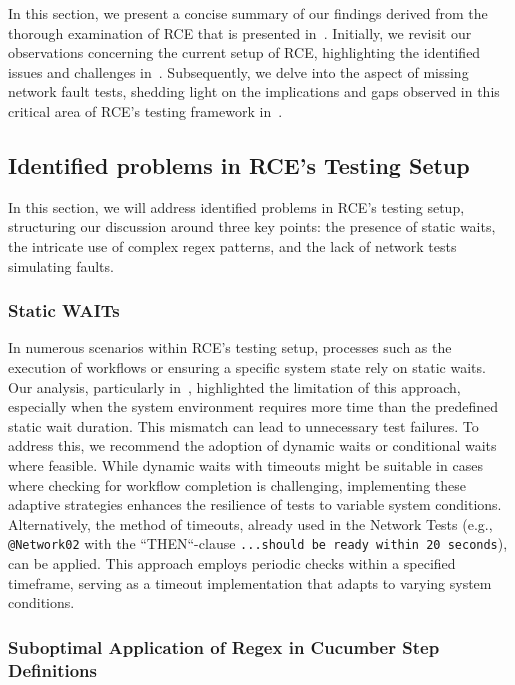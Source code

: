 In this section, we present a concise summary of our findings derived from the thorough examination of \ac{RCE} that is presented in~. Initially, we revisit our observations concerning the current setup of RCE, highlighting the identified issues and challenges in~. Subsequently, we delve into the aspect of missing network fault tests, shedding light on the implications and gaps observed in this critical area of RCE's testing framework in~. 

\subsection{Identified problems in RCE's Testing Setup}
\label{sub:identified-problems}
In this section, we will address identified problems in RCE's testing setup, structuring our discussion around three key points: the presence of static waits, the intricate use of complex regex patterns, and the lack of network tests simulating faults.

\subsubsection{Static WAITs}
In numerous scenarios within \ac{RCE}'s testing setup, processes such as the execution of workflows or ensuring a specific system state rely on static waits. Our analysis, particularly in~, highlighted the limitation of this approach, especially when the system environment requires more time than the predefined static wait duration. This mismatch can lead to unnecessary test failures. To address this, we recommend the adoption of dynamic waits or conditional waits where feasible. While dynamic waits with timeouts might be suitable in cases where checking for workflow completion is challenging, implementing these adaptive strategies enhances the resilience of tests to variable system conditions. Alternatively, the method of timeouts, already used in the Network Tests (e.g., \verb|@Network02| with the ``THEN``-clause \verb|...should be ready within 20 seconds|), can be applied. This approach employs periodic checks within a specified timeframe, serving as a timeout implementation that adapts to varying system conditions.


\subsubsection{Suboptimal Application of Regex in Cucumber Step Definitions}
\label{subsec:resultCucumber}

